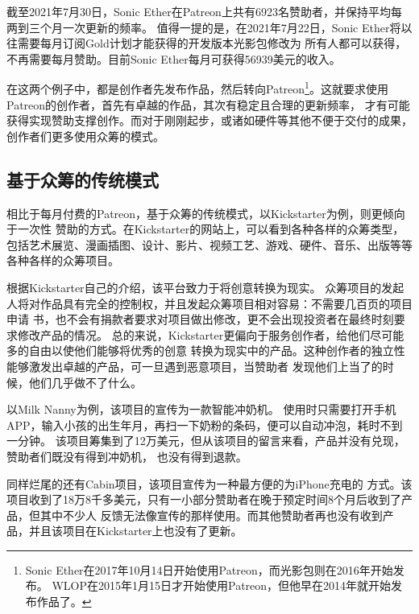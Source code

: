 \documentclass[11pt,UTF8,a4paper]{ctexart}
\begin{document}
    截至2021年7月30日，Sonic Ether在Patreon上共有6923名赞助者，并保持平均每两到三个月一次更新的频率。
    值得一提的是，在2021年7月22日，Sonic Ether将以往需要每月订阅Gold计划才能获得的开发版本光影包修改为
    所有人都可以获得，不再需要每月赞助。目前Sonic Ether每月可获得56939美元的收入。

    在这两个例子中，都是创作者先发布作品，然后转向Patreon\footnote{
        Sonic Ether在2017年10月14日开始使用Patreon，而光影包则在2016年开始发布。
        WLOP在2015年1月15日才开始使用Patreon，但他早在2014年就开始发布作品了。
    }。这就要求使用Patreon的创作者，首先有卓越的作品，其次有稳定且合理的更新频率，
    才有可能获得实现赞助支撑创作。而对于刚刚起步，或诸如硬件等其他不便于交付的成果，
    创作者们更多使用众筹的模式。

    \subsection{基于众筹的传统模式}\label{subsec:tradition_kickstarter}

    相比于每月付费的Patreon，基于众筹的传统模式，以Kickstarter为例，则更倾向于一次性
    赞助的方式。在Kickstarter的网站上，可以看到各种各样的众筹类型\cite{kickstarter_homepage}，
    包括艺术展览、漫画插图、设计、影片、视频工艺、游戏、硬件、音乐、出版等等各种各样的众筹项目。

    根据Kickstarter自己的介绍\cite{kickstarter_about}，该平台致力于将创意转换为现实。
    众筹项目的发起人将对作品具有完全的控制权，并且发起众筹项目相对容易：不需要几百页的项目申请
    书，也不会有捐款者要求对项目做出修改，更不会出现投资者在最终时刻要求修改产品的情况。
    总的来说，Kickstarter更偏向于服务创作者，给他们尽可能多的自由以使他们能够将优秀的创意
    转换为现实中的产品。这种创作者的独立性能够激发出卓越的产品，可一旦遇到恶意项目，当赞助者
    发现他们上当了的时候，他们几乎做不了什么。

    以Milk Nanny为例\cite{kickstarter_milk_nanny}，该项目的宣传为一款智能冲奶机。
    使用时只需要打开手机APP，输入小孩的出生年月，再扫一下奶粉的条码，便可以自动冲泡，耗时不到一分钟。
    该项目筹集到了12万美元，但从该项目的留言来看，产品并没有兑现，赞助者们既没有得到冲奶机，
    也没有得到退款。

    同样烂尾的还有Cabin项目\cite{kickstarter_cabin}，该项目宣传为一种最方便的为iPhone充电的
    方式。该项目收到了18万8千多美元，只有一小部分赞助者在晚于预定时间8个月后收到了产品，但其中不少人
    反馈无法像宣传的那样使用。而其他赞助者再也没有收到产品，并且该项目在Kickstarter上也没有了更新。
\end{document}
